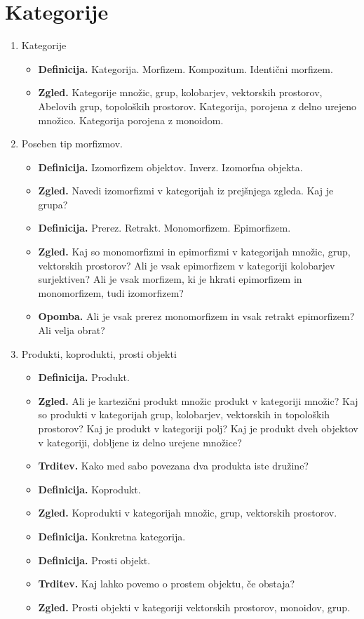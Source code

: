 \section{Kategorije}
\begin{enumerate}
    \item Kategorije
    \begin{itemize}
        \item \textbf{Definicija.} Kategorija. Morfizem. Kompozitum. Identični morfizem.
        \item \textbf{Zgled.} Kategorije množic, grup, kolobarjev, vektorskih prostorov, Abelovih grup, topoloških prostorov. Kategorija, porojena z delno urejeno množico. Kategorija porojena z monoidom.
    \end{itemize}

    \item Poseben tip morfizmov.
    \begin{itemize}
        \item \textbf{Definicija.} Izomorfizem objektov. Inverz. Izomorfna objekta.
        \item \textbf{Zgled.} Navedi izomorfizmi v kategorijah iz prejšnjega zgleda. Kaj je grupa?
        \item \textbf{Definicija.} Prerez. Retrakt. Monomorfizem. Epimorfizem.
        \item \textbf{Zgled.} Kaj so monomorfizmi in epimorfizmi v kategorijah množic, grup, vektorskih prostorov? Ali je vsak epimorfizem v kategoriji kolobarjev surjektiven? Ali je vsak morfizem, ki je hkrati epimorfizem in monomorfizem, tudi izomorfizem?
        \item \textbf{Opomba.} Ali je vsak prerez monomorfizem in vsak retrakt epimorfizem? Ali velja obrat?
    \end{itemize}

    \item Produkti, koprodukti, prosti objekti
    \begin{itemize}
        \item \textbf{Definicija.} Produkt.
        \item \textbf{Zgled.} Ali je kartezični produkt množic produkt v kategoriji množic? Kaj so produkti v kategorijah grup, kolobarjev, vektorskih in topoloških prostorov? Kaj je produkt v kategoriji polj? Kaj je produkt dveh objektov v kategoriji, dobljene iz delno urejene množice? 
        \item \textbf{Trditev.} Kako med sabo povezana dva produkta iste družine?
        \item \textbf{Definicija.} Koprodukt.
        \item \textbf{Zgled.} Koprodukti v kategorijah množic, grup, vektorskih prostorov.
        \item \textbf{Definicija.} Konkretna kategorija.
        \item \textbf{Definicija.} Prosti objekt.
        \item \textbf{Trditev.} Kaj lahko povemo o prostem objektu, če obstaja?
        \item \textbf{Zgled.} Prosti objekti v kategoriji vektorskih prostorov, monoidov, grup.
    \end{itemize}
\end{enumerate}